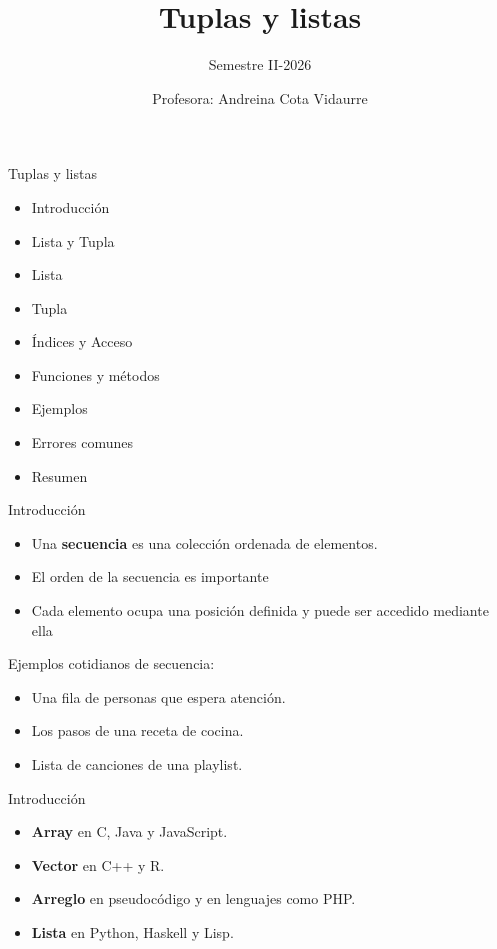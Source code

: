 \documentclass{beamer}
\title{Tuplas y listas} %
\subtitle{Semestre II-2026} %
\author{Profesora: Andreina Cota Vidaurre}
\begin{document}
  \shorthandoff{-}
  \frame[c]{\maketitle}


    \begin{frame}{Tuplas y listas}
        \begin{itemize}
            \item Introducción
            \item Lista y Tupla
            \item Lista
            \item Tupla
            \item Índices y Acceso
            \item Funciones y métodos
            \item Ejemplos
            \item Errores comunes
            \item Resumen
        \end{itemize}
    \end{frame}

    \begin{frame}{Introducción}
        \begin{itemize}
            \item Una \textbf{secuencia} es una colección ordenada de elementos.
            \item El orden de la secuencia es importante
            \item Cada elemento ocupa una posición definida y puede ser accedido mediante ella
        \end{itemize}
        Ejemplos cotidianos de secuencia:
        \begin{itemize}
            \item Una fila de personas que espera atención.
            \item Los pasos de una receta de cocina.
            \item Lista de canciones de una playlist.
        \end{itemize}
    \end{frame}

    \begin{frame}{Introducción}
        \begin{itemize}
            \item \textbf{Array} en C, Java y JavaScript.
            \item \textbf{Vector} en C++ y R.
            \item \textbf{Arreglo} en pseudocódigo y en lenguajes como PHP.
            \item \textbf{Lista} en Python, Haskell y Lisp.
        \end{itemize}
    \end{frame}
\end{document}
